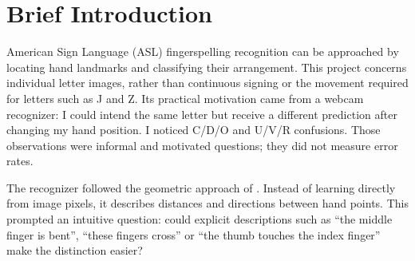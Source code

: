 \documentclass{article}
\begin{document}
\printAffiliationsAndNotice{}
\begin{abstract}
Can descriptions that help a person distinguish hand shapes also improve a letter recognizer? Informal webcam confusion among C/D/O and U/V/R motivated this study of explicit hand-shape features added to a Shin-based reference. I compared categorical finger descriptions, workbook-based agreement scores and continuous joint measurements using SVM and LightGBM. All main comparisons used the same 60,251 accepted landmark detections from Kaggle ASL Alphabet and five grouped validation folds. For SVM, adding the full feature package did not improve accuracy (97.628\% versus 97.637\%). Adding only the joint measurements to the reference reached 97.748\%, with macro-F1 increasing from 0.97386 to 0.97524: 67 additional correct predictions. Benefits differed by letter, and some letters regressed. Ablation, grouped permutation and bounded weighting experiments supported a qualified conclusion: the representation matters more than simply supplying more features. The observed angle benefit is small and specific to this evaluation; it does not establish better recognition of unseen people or reliable webcam use.
\end{abstract}

\section{Brief Introduction}
American Sign Language (ASL) fingerspelling recognition can be approached by locating hand landmarks and classifying their arrangement. This project concerns individual letter images, rather than continuous signing or the movement required for letters such as J and Z. Its practical motivation came from a webcam recognizer: I could intend the same letter but receive a different prediction after changing my hand position. I noticed C/D/O and U/V/R confusions. Those observations were informal and motivated questions; they did not measure error rates.

The recognizer followed the geometric approach of \citet{shin2021}. Instead of learning directly from image pixels, it describes distances and directions between hand points. This prompted an intuitive question: could explicit descriptions such as ``the middle finger is bent'', ``these fingers cross'' or ``the thumb touches the index finger'' make the distinction easier?
\end{document}
